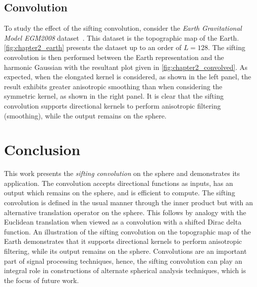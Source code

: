 

\subsection{Convolution}\label{sec:chapter2_convolution}

To study the effect of the sifting convolution, consider the \emph{Earth Gravitational Model EGM2008} dataset~\autocite{Pavlis2013}.
This dataset is the topographic map of the Earth.
\cref{fig:chapter2_earth} presents the dataset up to an order of \(L=128\).
The sifting convolution is then performed between the Earth representation and the harmonic Gaussian with the resultant plot given in \cref{fig:chapter2_convolved}.
As expected, when the elongated kernel is considered, as shown in the left panel, the result exhibits greater anisotropic smoothing than when considering the symmetric kernel, as shown in the right panel.
It is clear that the sifting convolution supports directional kernels to perform anisotropic filtering (smoothing), while the output remains on the sphere.





\section{Conclusion}\label{sec:chapter2_conclusion}

This work presents the \emph{sifting convolution} on the sphere and demonstrates its application.
The convolution accepts directional functions as inputs, has an output which remains on the sphere, and is efficient to compute.
The sifting convolution is defined in the usual manner through the inner product but with an alternative translation operator on the sphere.
This follows by analogy with the Euclidean translation when viewed as a convolution with a shifted Dirac delta function.
An illustration of the sifting convolution on the topographic map of the Earth demonstrates that it supports directional kernels to perform anisotropic filtering, while its output remains on the sphere.
Convolutions are an important part of signal processing techniques, hence, the sifting convolution can play an integral role in constructions of alternate spherical analysis techniques, which is the focus of future work.
